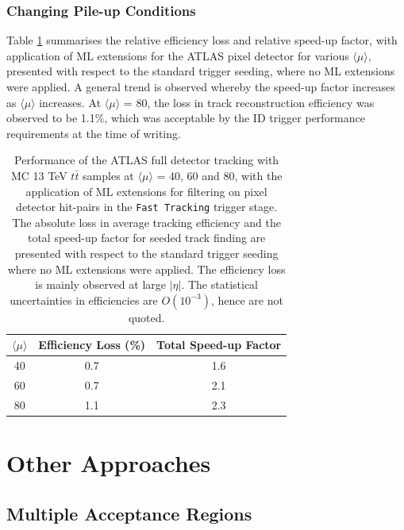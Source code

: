 \subsubsection{Changing Pile-up Conditions}

Table \ref{tab:pileup} summarises the relative efficiency loss and relative speed-up factor, with application of ML extensions for the ATLAS pixel detector for various $\langle \mu \rangle$, presented with respect to the standard trigger seeding, where no ML extensions were applied. A general trend is observed whereby the speed-up factor increases as $\langle \mu \rangle$ increases. At $\langle \mu \rangle$ = 80, the loss in track reconstruction efficiency was observed to be 1.1\%, which was acceptable by the ID trigger performance requirements at the time of writing.


\begin{table}[!htbp]
\caption{Performance of the ATLAS full detector tracking with MC 13 TeV $t\bar{t}$ samples at $\langle \mu \rangle$ = 40, 60 and 80, with the application of ML extensions for filtering on pixel detector hit-pairs in the \texttt{Fast Tracking} trigger stage\cite{public-hlt}. The absolute loss in average tracking efficiency and the total speed-up factor for seeded track finding are presented with respect to the standard trigger seeding where no ML extensions were applied. The efficiency loss is mainly observed at large $|\eta|$. The statistical uncertainties in efficiencies are $O(10^{-3})$, hence are not quoted.}
\begin{center}
\begin{tabular}{ccc}
\toprule
$\langle \mu \rangle$ & Efficiency Loss (\%) & Total Speed-up Factor  \\
\hline
40 & 0.7 & 1.6 \\
60 & 0.7 & 2.1 \\
80 & 1.1 & 2.3 \\
\bottomrule
\end{tabular}
\end{center}
\label{tab:pileup}
\end{table}


\section{Other Approaches}
\subsection{Multiple Acceptance Regions}

